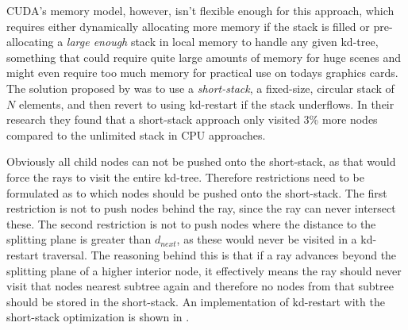 CUDA's memory model, however, isn't flexible enough for this approach, which
requires either dynamically allocating more memory if the stack is filled or
pre-allocating a \textit{large enough} stack in local memory to handle any given
kd-tree, something that could require quite large amounts of memory for huge
scenes and might even require too much memory for practical use on todays
graphics cards. The solution proposed by \horn{} was to use a
\textit{short-stack}, a fixed-size, circular stack of $N$ elements, and then
revert to using kd-restart if the stack underflows. In their research they found
that a short-stack approach only visited 3\% more nodes compared to the
unlimited stack in CPU approaches.


Obviously all child nodes can not be pushed onto the short-stack, as that would
force the rays to visit the entire kd-tree. Therefore restrictions need to be
formulated as to which nodes should be pushed onto the short-stack. The first
restriction is not to push nodes behind the ray, since the ray can never
intersect these. The second restriction is not to push nodes where the distance
to the splitting plane is greater than $d_{next}$, as these would never be
visited in a kd-restart traversal. The reasoning behind this is that if a ray
advances beyond the splitting plane of a higher interior node, it effectively
means the ray should never visit that nodes nearest subtree again and therefore
no nodes from that subtree should be stored in the short-stack. An
implementation of kd-restart with the short-stack optimization is shown in
.

